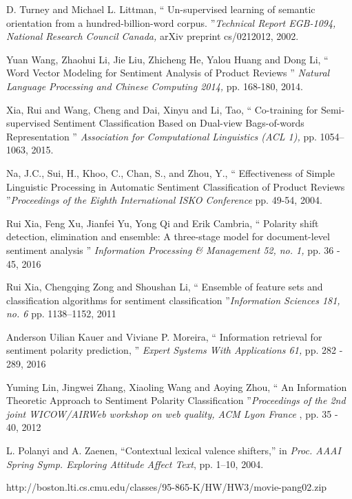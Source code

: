 \documentclass[oneside,a4paper,12pt]{pictreport}
\begin{document}
\begin{thebibliography}{20}
 
  
  D. Turney and Michael L. Littman, `` Un-supervised learning of semantic orientation from
a hundred-billion-word corpus. ''{\em Technical Report
EGB-1094, National Research Council Canada,} arXiv preprint cs/0212012, 2002.

  Yuan Wang, Zhaohui Li, Jie Liu, Zhicheng He, Yalou Huang and Dong Li,
 `` Word Vector Modeling for Sentiment Analysis
of Product Reviews '' {\em Natural Language Processing and Chinese Computing 2014,} pp. 168-180, 2014.


Xia, Rui and Wang, Cheng and Dai, Xinyu and Li, Tao, 
`` Co-training for Semi-supervised Sentiment Classification Based on Dual-view Bags-of-words Representation ''
  {\em Association for Computational Linguistics (ACL 1),} pp. 1054–1063, 2015.
  
Na, J.C., Sui, H., Khoo, C., Chan, S., and Zhou, Y., `` Effectiveness of Simple Linguistic Processing in Automatic 
Sentiment Classification of Product Reviews ''{\em Proceedings 
of the Eighth International ISKO Conference
 } pp. 49-54, 2004.
 
 Rui Xia, Feng Xu, Jianfei Yu, Yong Qi and Erik Cambria, `` Polarity shift detection, elimination and ensemble:
A three-stage model for document-level sentiment analysis '' {\em  Information Processing \& Management 52, no. 1, } pp. 36 - 45, 2016

Rui Xia, Chengqing Zong and Shoushan Li, `` Ensemble of feature sets and classification algorithms
for sentiment classification ''{\em  Information Sciences 181, no. 6 } pp. 1138–1152, 2011

Anderson Uilian Kauer and Viviane P. Moreira, `` Information retrieval for sentiment polarity prediction, ''
{\em Expert Systems With Applications 61,} pp. 282 - 289, 2016

Yuming Lin, Jingwei Zhang, Xiaoling Wang and Aoying Zhou, `` An Information Theoretic Approach to Sentiment Polarity
Classification ''{\em Proceedings of the 2nd joint WICOW/AIRWeb workshop on web quality, ACM Lyon France }, pp. 35 - 40, 2012


L. Polanyi and A. Zaenen, ``Contextual lexical valence shifters,'' in
{\em Proc. AAAI Spring Symp. Exploring Attitude Affect Text}, pp. 1–10, 2004.

http://boston.lti.cs.cmu.edu/classes/95-865-K/HW/HW3/movie-pang02.zip
\end{thebibliography}
\end{document}
